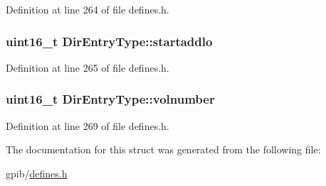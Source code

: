Definition at line 264 of file defines.\+h.

\subsubsection[{\texorpdfstring{startaddlo}{startaddlo}}]{\setlength{\rightskip}{0pt plus 5cm}uint16\+\_\+t Dir\+Entry\+Type\+::startaddlo}\hypertarget{structDirEntryType_aea0e798bb172b4bddf174ce339a4a54a}{}\label{structDirEntryType_aea0e798bb172b4bddf174ce339a4a54a}


Definition at line 265 of file defines.\+h.

\subsubsection[{\texorpdfstring{volnumber}{volnumber}}]{\setlength{\rightskip}{0pt plus 5cm}uint16\+\_\+t Dir\+Entry\+Type\+::volnumber}\hypertarget{structDirEntryType_add9ab11f89586efb100471f6580e75c5}{}\label{structDirEntryType_add9ab11f89586efb100471f6580e75c5}


Definition at line 269 of file defines.\+h.



The documentation for this struct was generated from the following file\+:\begin{DoxyCompactItemize}
\item 
gpib/\hyperlink{defines_8h}{defines.\+h}\end{DoxyCompactItemize}
